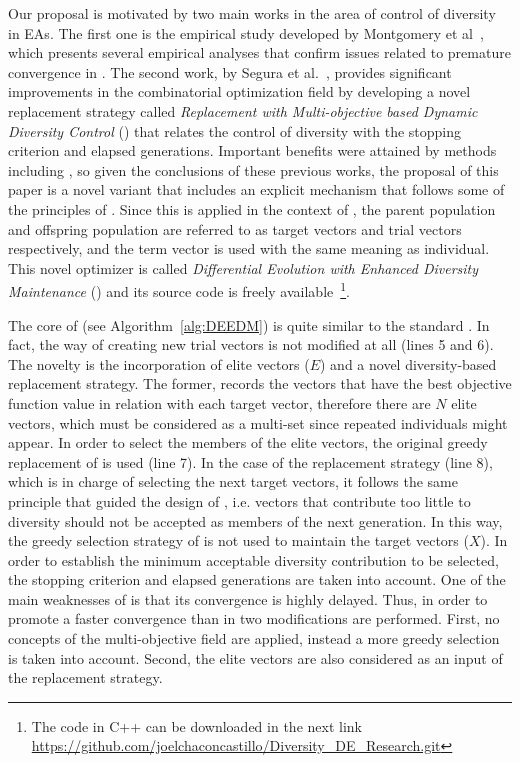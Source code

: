 Our proposal is motivated by two main works in the area of control of diversity in EAs.
%
The first one is the empirical study developed by Montgomery et al~\cite{montgomery2012simple},
which presents several empirical analyses that confirm issues related to premature convergence in \DE{}.
%
The second work, by Segura et al.~\cite{segura2016novel}, provides significant improvements in the combinatorial optimization field
by developing a novel replacement strategy called \textit{Replacement with Multi-objective based Dynamic Diversity Control} (\RMDDC{}) 
that relates the control of diversity with the stopping criterion and elapsed generations.
%
Important benefits were attained by methods including \RMDDC{}, so given the conclusions of these previous works, the proposal of this paper is a 
novel \DE{} variant that includes an explicit mechanism that follows some of the principles of \RMDDC{}.
%
Since this is applied in the context of \DE{}, the parent population and offspring population are referred to as 
target vectors and trial vectors respectively, and the term vector is used with the same meaning as individual.
%
This novel optimizer is called \textit{Differential Evolution with Enhanced Diversity Maintenance} (\DEEDM{}) and its source
code is freely available~\footnote{The code in C++ can be downloaded in the next link \url{https://github.com/joelchaconcastillo/Diversity\_DE\_Research.git}}.

The core of \DEEDM{} (see Algorithm~\ref{alg:DEEDM}) is quite similar to the standard \DE{}.
%
In fact, the way of creating new trial vectors is not modified at all (lines 5 and 6).
%
The novelty is the incorporation of elite vectors ($E$) and a novel diversity-based replacement strategy.
%
The former, records the vectors that have the best objective function value in relation with each target vector, therefore there are $N$ elite vectors, which must be considered as a multi-set since repeated individuals might appear.
%
In order to select the members of the elite vectors, the original greedy replacement of \DE{} is used (line 7).
%
In the case of the replacement strategy (line 8), which is in charge of selecting the next target vectors,
it follows the same principle that guided the 
design of \RMDDC{}, i.e. vectors that contribute too little to diversity should not be accepted as members of the next generation.
%
In this way, the greedy selection strategy of \DE{} is not used to maintain the target vectors ($X$).
%
In order to establish the minimum acceptable diversity contribution to be selected, the stopping criterion and elapsed
generations are taken into account.
%
One of the main weaknesses of \RMDDC{} is that its convergence is highly delayed.
%
Thus, in order to promote a faster convergence than in \RMDDC{} two modifications are performed.
%
First, no concepts of the multi-objective field are applied, instead a more greedy selection is taken into account.
%
Second, the elite vectors are also considered as an input of the replacement strategy.

